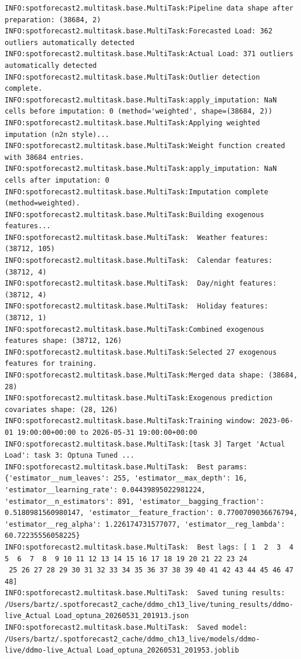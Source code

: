 \documentclass[
  english,
  letterpaper,
]{scrbook}
\begin{document}
\begin{verbatim}
INFO:spotforecast2.multitask.base.MultiTask:Pipeline data shape after preparation: (38684, 2)
INFO:spotforecast2.multitask.base.MultiTask:Forecasted Load: 362 outliers automatically detected
INFO:spotforecast2.multitask.base.MultiTask:Actual Load: 371 outliers automatically detected
INFO:spotforecast2.multitask.base.MultiTask:Outlier detection complete.
INFO:spotforecast2.multitask.base.MultiTask:apply_imputation: NaN cells before imputation: 0 (method='weighted', shape=(38684, 2))
INFO:spotforecast2.multitask.base.MultiTask:Applying weighted imputation (n2n style)...
INFO:spotforecast2.multitask.base.MultiTask:Weight function created with 38684 entries.
INFO:spotforecast2.multitask.base.MultiTask:apply_imputation: NaN cells after imputation: 0
INFO:spotforecast2.multitask.base.MultiTask:Imputation complete (method=weighted).
INFO:spotforecast2.multitask.base.MultiTask:Building exogenous features...
INFO:spotforecast2.multitask.base.MultiTask:  Weather features: (38712, 105)
INFO:spotforecast2.multitask.base.MultiTask:  Calendar features: (38712, 4)
INFO:spotforecast2.multitask.base.MultiTask:  Day/night features: (38712, 4)
INFO:spotforecast2.multitask.base.MultiTask:  Holiday features: (38712, 1)
INFO:spotforecast2.multitask.base.MultiTask:Combined exogenous features shape: (38712, 126)
INFO:spotforecast2.multitask.base.MultiTask:Selected 27 exogenous features for training.
INFO:spotforecast2.multitask.base.MultiTask:Merged data shape: (38684, 28)
INFO:spotforecast2.multitask.base.MultiTask:Exogenous prediction covariates shape: (28, 126)
INFO:spotforecast2.multitask.base.MultiTask:Training window: 2023-06-01 19:00:00+00:00 to 2026-05-31 19:00:00+00:00
INFO:spotforecast2.multitask.base.MultiTask:[task 3] Target 'Actual Load': task 3: Optuna Tuned ...
INFO:spotforecast2.multitask.base.MultiTask:  Best params: {'estimator__num_leaves': 255, 'estimator__max_depth': 16, 'estimator__learning_rate': 0.04439895022981224, 'estimator__n_estimators': 891, 'estimator__bagging_fraction': 0.5180981560980147, 'estimator__feature_fraction': 0.7700709036676794, 'estimator__reg_alpha': 1.226174731577077, 'estimator__reg_lambda': 60.72235556058225}
INFO:spotforecast2.multitask.base.MultiTask:  Best lags: [ 1  2  3  4  5  6  7  8  9 10 11 12 13 14 15 16 17 18 19 20 21 22 23 24
 25 26 27 28 29 30 31 32 33 34 35 36 37 38 39 40 41 42 43 44 45 46 47 48]
INFO:spotforecast2.multitask.base.MultiTask:  Saved tuning results: /Users/bartz/.spotforecast2_cache/ddmo_ch13_live/tuning_results/ddmo-live_Actual Load_optuna_20260531_201913.json
INFO:spotforecast2.multitask.base.MultiTask:  Saved model: /Users/bartz/.spotforecast2_cache/ddmo_ch13_live/models/ddmo-live/ddmo-live_Actual Load_optuna_20260531_201953.joblib
\end{verbatim}
\end{document}
